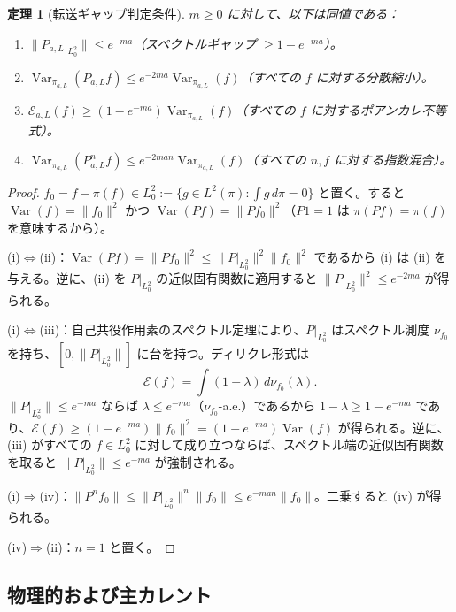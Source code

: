 \documentclass[12pt]{article}
\theoremstyle{plain}
\newtheorem{theorem}{定理}[section]
\theoremstyle{definition}
\numberwithin{equation}{section}
\newcommand{\Var}{\operatorname{Var}}
\begin{document}
\begin{theorem}[転送ギャップ判定条件]\label{thm:transfergap}
$m\geq 0$ に対して、以下は同値である：
\begin{enumerate}[label=(\roman*)]
\item $\|P_{a,L}|_{L^2_0}\|\leq e^{-ma}$（スペクトルギャップ $\geq 1-e^{-ma}$）。
\item $\Var_{\pi_{a,L}}(P_{a,L}f)\leq e^{-2ma}\Var_{\pi_{a,L}}(f)$（すべての $f$ に対する分散縮小）。
\item $\mathcal{E}_{a,L}(f)\geq(1-e^{-ma})\Var_{\pi_{a,L}}(f)$（すべての $f$ に対するポアンカレ不等式）。
\item $\Var_{\pi_{a,L}}(P_{a,L}^n f)\leq e^{-2man}\Var_{\pi_{a,L}}(f)$（すべての $n,f$ に対する指数混合）。
\end{enumerate}
\end{theorem}

\begin{proof}
$f_0=f-\pi(f)\in L^2_0:=\{g\in L^2(\pi):\int g\,d\pi=0\}$ と置く。すると $\Var(f)=\|f_0\|^2$ かつ $\Var(Pf)=\|Pf_0\|^2$（$P1=1$ は $\pi(Pf)=\pi(f)$ を意味するから）。

(i)$\Leftrightarrow$(ii)：$\Var(Pf)=\|Pf_0\|^2\leq\|P|_{L^2_0}\|^2\|f_0\|^2$ であるから (i) は (ii) を与える。逆に、(ii) を $P|_{L^2_0}$ の近似固有関数に適用すると $\|P|_{L^2_0}\|^2\leq e^{-2ma}$ が得られる。

(i)$\Leftrightarrow$(iii)：自己共役作用素のスペクトル定理により、$P|_{L^2_0}$ はスペクトル測度 $\nu_{f_0}$ を持ち、$[0,\|P|_{L^2_0}\|]$ に台を持つ。ディリクレ形式は
\begin{equation}
\mathcal{E}(f) = \int(1-\lambda)\,d\nu_{f_0}(\lambda).
\end{equation}
$\|P|_{L^2_0}\|\leq e^{-ma}$ ならば $\lambda\leq e^{-ma}$（$\nu_{f_0}$-a.e.）であるから $1-\lambda\geq 1-e^{-ma}$ であり、$\mathcal{E}(f)\geq(1-e^{-ma})\|f_0\|^2=(1-e^{-ma})\Var(f)$ が得られる。逆に、(iii) がすべての $f\in L^2_0$ に対して成り立つならば、スペクトル端の近似固有関数を取ると $\|P|_{L^2_0}\|\leq e^{-ma}$ が強制される。

(i)$\Rightarrow$(iv)：$\|P^n f_0\|\leq\|P|_{L^2_0}\|^n\|f_0\|\leq e^{-man}\|f_0\|$。二乗すると (iv) が得られる。

(iv)$\Rightarrow$(ii)：$n=1$ と置く。
\end{proof}

\subsection{物理的および主カレント}
\end{document}
